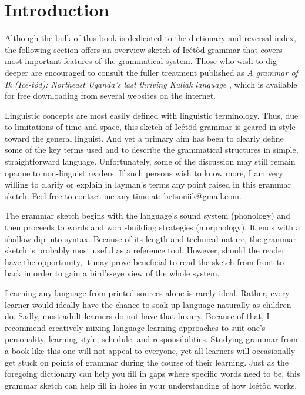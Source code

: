 \setcounter{section}{0}
\section{Introduction}\label{sec:1}


Although the bulk of this book is dedicated to the dictionary and reversal index, the following section offers an overview sketch of Icétôd grammar that covers most important features of the grammatical system. Those who wish to dig deeper are encouraged to consult the fuller treatment published as \textit{A grammar of Ik (Icé-tód): Northeast Uganda’s last thriving Kuliak language} \citep{Schrock2014}, which is available for free downloading from several websites on the internet. 

Linguistic concepts are most easily defined with linguistic terminology. Thus, due to limitations of time and space, this sketch of Icétôd grammar is geared in style toward the general linguist. And yet a primary aim has been to clearly define some of the key terms used and to describe the grammatical structures in simple, straightforward language. Unfortunately, some of the discussion may still remain opaque to non-linguist readers. If such persons wish to know more, I am very willing to clarify or explain in layman’s terms any point raised in this grammar sketch. Feel free to contact me any time at: \href{mailto:betsoniik@gmail.com}{betsoniik@gmail.com}.

The grammar sketch begins with the language’s sound system (phonology) and then proceeds to words and word-building strategies (morphology). It ends with a shallow dip into syntax. Because of its length and technical nature, the grammar sketch is probably most useful as a reference tool. However, should the reader have the opportunity, it may prove beneficial to read the sketch from front to back in order to gain a bird’s-eye view of the whole system.

Learning any language from printed sources alone is rarely ideal. Rather, every learner would ideally have the chance to soak up language naturally as children do. Sadly, most adult learners do not have that luxury. Because of that, I recommend creatively mixing language-learning approaches to suit one’s personality, learning style, schedule, and responsibilities. Studying grammar from a book like this one will not appeal to everyone, yet all learners will occasionally get stuck on points of grammar during the course of their learning. Just as the foregoing dictionary can help you fill in gaps where specific words need to be, this grammar sketch can help fill in holes in your understanding of how Icétôd works.